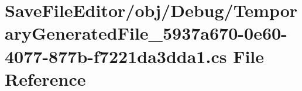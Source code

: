 \hypertarget{_save_file_editor_2obj_2_debug_2_temporary_generated_file__5937a670-0e60-4077-877b-f7221da3dda1_8cs}{}\section{Save\+File\+Editor/obj/\+Debug/\+Temporary\+Generated\+File\+\_\+5937a670-\/0e60-\/4077-\/877b-\/f7221da3dda1.cs File Reference}
\label{_save_file_editor_2obj_2_debug_2_temporary_generated_file__5937a670-0e60-4077-877b-f7221da3dda1_8cs}

